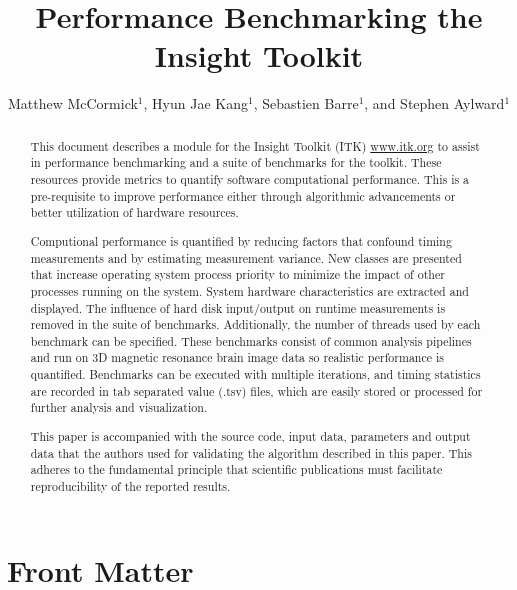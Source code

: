 \documentclass{InsightArticle}
\title{Performance Benchmarking the Insight Toolkit}
\author{Matthew McCormick$^{1}$, Hyun Jae Kang$^{1}$, Sebastien Barre$^{1}$, and Stephen Aylward$^{1}$}
\newcommand{\IJhandlerIDnumber}{1338}
\begin{document}
%
%
\IJhandlefooter{\IJhandlerIDnumber}


\ifpdf
\else
\fi


\maketitle


\ifhtml
\chapter*{Front Matter\label{front}}
\fi

\begin{abstract} \noindent This document describes a module for the Insight
Toolkit (ITK) \url{www.itk.org} to assist in performance benchmarking and a
suite of benchmarks for the toolkit. These resources provide metrics to
quantify software computational performance. This is a pre-requisite to
improve performance either through algorithmic advancements or better
utilization of hardware resources.

Computional performance is quantified by reducing factors that confound timing
measurements and by estimating measurement variance. New classes are presented
that increase operating system process priority to minimize the impact of
other processes running on the system. System hardware characteristics are
extracted and displayed. The influence of hard disk input/output on runtime
measurements is removed in the suite of benchmarks. Additionally, the number
of threads used by each benchmark can be specified. These benchmarks consist
of common analysis pipelines and run on 3D magnetic resonance brain image data
so realistic performance is quantified. Benchmarks can be executed with
multiple iterations, and timing statistics are recorded in tab separated value
(.tsv) files, which are easily stored or processed for further analysis and
visualization.

This paper is accompanied with the source code, input data, parameters and
output data that the authors used for validating the algorithm described in
this paper. This adheres to the fundamental principle that scientific
publications must facilitate reproducibility of the reported results.

\end{abstract}
\end{document}
